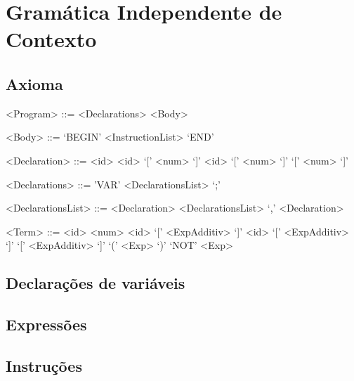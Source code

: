 \section{Gramática Independente de Contexto}
\label{sec:gramatica:desenho}

\subsection{Axioma}
\label{sec:subsec:axioma:desenho}

\begin{grammar}

<Program> ::= <Declarations> <Body>

<Body> ::= `BEGIN' <InstructionList> `END'

<Declaration> ::= <id>
\alt <id> `[' <num> `]'
\alt <id> `[' <num> `]' `[' <num> `]'

<Declarations> ::= 'VAR' <DeclarationsList> `;' 

<DeclarationsList> ::= <Declaration> 
\alt <DeclarationsList> `,' <Declaration> 

<Term> ::= <id>
\alt <num>
\alt <id> `[' <ExpAdditiv> `]'
\alt <id> `[' <ExpAdditiv> `]' `[' <ExpAdditiv> `]'
\alt `(' <Exp> `)'
\alt `NOT' <Exp>

\end{grammar}


\subsection{Declarações de variáveis}
\label{sec:subsec:declaracoes:desenho}


\subsection{Expressões}
\label{sec:subsec:expressoes:desenho}


\subsection{Instruções}
\label{sec:subsec:instrucoes:desenho}



